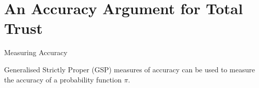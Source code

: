 \documentclass[aspectratio=169, dvipsnames]{beamer}
\newcommand{\E}{\mathbb{E}}
\newcommand{\W}{\mathcal{W}}
\begin{document}


\section{An Accuracy Argument for Total Trust}

\begin{frame}{Measuring Accuracy}

  \alert{Generalised Strictly Proper} (GSP) measures of accuracy can be used to measure the accuracy of
  a probability function $\pi$.
\end{frame}

\end{document}
